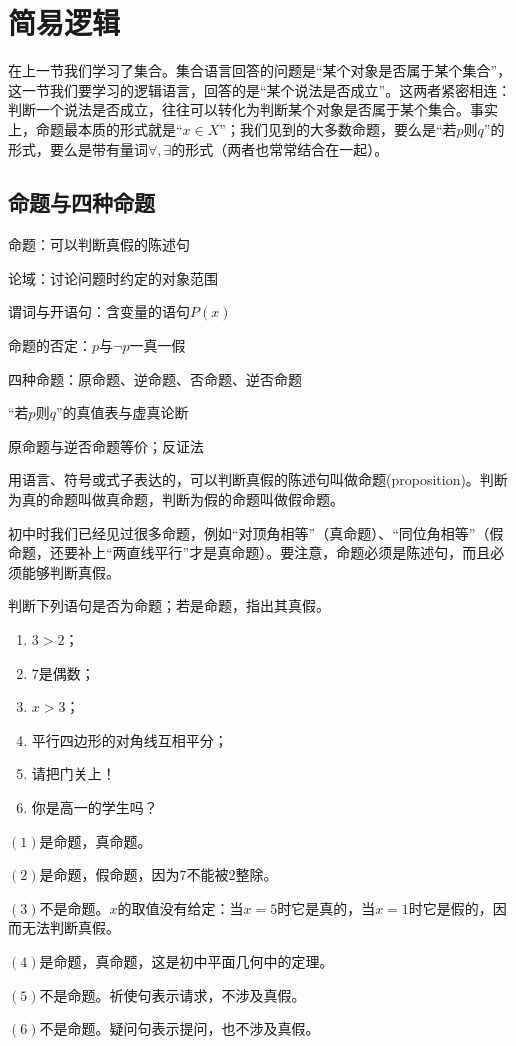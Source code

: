 \section{简易逻辑}
在上一节我们学习了集合。集合语言回答的问题是“某个对象是否属于某个集合”，这一节我们要学习的逻辑语言，回答的是“某个说法是否成立”。这两者紧密相连：判断一个说法是否成立，往往可以转化为判断某个对象是否属于某个集合。事实上，命题最本质的形式就是“$x\in X$”；我们见到的大多数命题，要么是“若$p$则$q$”的形式，要么是带有量词$\forall,\exists$的形式（两者也常常结合在一起）。

\clearpage
\subsection{命题与四种命题}
\begin{know}
    \item 命题：可以判断真假的陈述句
    \item 论域：讨论问题时约定的对象范围
    \item 谓词与开语句：含变量的语句$P(x)$
    \item 命题的否定：$p$与$\neg p$一真一假
    \item 四种命题：原命题、逆命题、否命题、逆否命题
    \item “若$p$则$q$”的真值表与虚真论断
    \item 原命题与逆否命题等价；反证法
\end{know}

\begin{definition}[命题]
用语言、符号或式子表达的，可以判断真假的陈述句叫做命题(proposition)。判断为真的命题叫做真命题，判断为假的命题叫做假命题。
\end{definition}

初中时我们已经见过很多命题，例如“对顶角相等”（真命题）、“同位角相等”（假命题，还要补上“两直线平行”才是真命题）。要注意，命题必须是陈述句，而且必须能够判断真假。

\begin{example}
判断下列语句是否为命题；若是命题，指出其真假。
\begin{enumerate}
    \item $3>2$；
    \item $7$是偶数；
    \item $x>3$；
    \item 平行四边形的对角线互相平分；
    \item 请把门关上！
    \item 你是高一的学生吗？
\end{enumerate}
\end{example}
\begin{jie}
    $(1)$是命题，真命题。

    $(2)$是命题，假命题，因为$7$不能被$2$整除。

    $(3)$不是命题。$x$的取值没有给定：当$x=5$时它是真的，当$x=1$时它是假的，因而无法判断真假。

    $(4)$是命题，真命题，这是初中平面几何中的定理。

    $(5)$不是命题。祈使句表示请求，不涉及真假。

    $(6)$不是命题。疑问句表示提问，也不涉及真假。
\end{jie}

